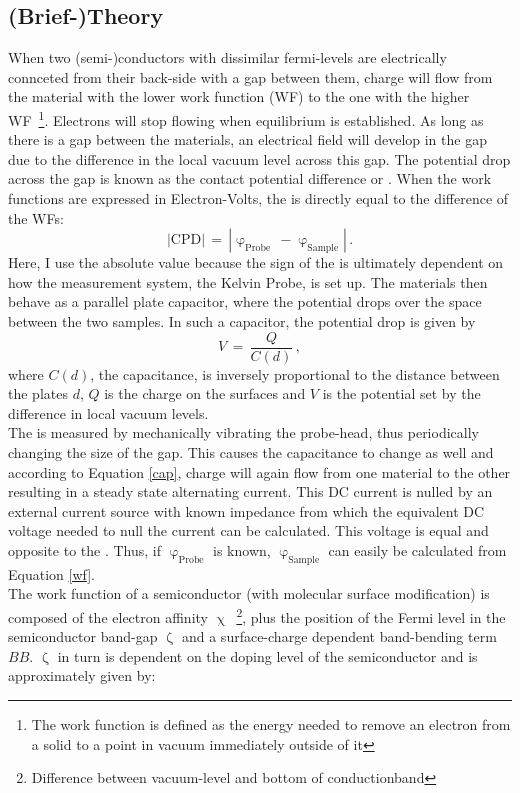 \documentclass[a4paper,10pt]{article}
\newcommand{\wfp}{\ensuremath{\upvarphi _{\text{Probe}}}}
\newcommand{\wfs}{\ensuremath{\upvarphi _{\text{Sample}}}}
\newcommand{\cpd}{\text{CPD}}
\newcommand{\wf}{WF}
\begin{document}
\subsection{(Brief-)Theory}
When two (semi-)conductors with dissimilar fermi-levels are electrically connceted from their back-side with a gap between them, charge will flow from the material with the lower work function (\wf{}) to the one with the higher \wf{}~\footnote{The work function is defined as the energy needed to remove an electron from a solid to a point in vacuum immediately outside of it}. Electrons will stop flowing when equilibrium is established. As long as there is a gap between the materials, an electrical field will develop in the gap due to the difference in the local vacuum level across this gap. 
The potential drop across the gap is known as the contact potential difference or \cpd{}. When the work functions are expressed in Electron-Volts, the \cpd{} is directly equal to the difference of the \wf{}s:
\begin{equation}
\label{wf}
	|{\cpd}| \, = \, | \wfp \, - \wfs | \, .
\end{equation}
Here, I use the absolute value because the sign of the \cpd{} is ultimately dependent on how the measurement system, the Kelvin Probe, is set up. The materials then behave as a parallel plate capacitor, where the potential drops over the space between the two samples. In such a capacitor, the potential drop is given by
\begin{equation}
\label{cap}
	V \, = \,  \frac{Q}{C(d)} \, , 
\end{equation}
where $C(d)$, the capacitance, is inversely proportional to the distance between the plates $d$, $Q$ is the charge on the surfaces and $V$ is the potential set by the difference in local vacuum levels.\\
The \cpd{} is measured by mechanically vibrating the probe-head, thus periodically changing the size of the gap. This causes the capacitance to change as well and according to Equation \eqref{cap}, charge will again flow from one material to the other resulting in a steady state alternating current. This DC current is nulled by an external current source with known impedance from which the equivalent DC voltage needed to null the current can be calculated. This voltage is equal and opposite to the \cpd{}. Thus, if \wfp{} is known, \wfs{} can easily be calculated from Equation \eqref{wf}.\\
The work function of a semiconductor (with molecular surface modification) is composed of the electron affinity $\upchi$~\footnote{Difference between vacuum-level and bottom of conductionband}, plus the position of the Fermi level in the semiconductor band-gap $\upzeta$ and a surface-charge dependent band-bending term $BB$. $\upzeta$ in turn is dependent on the doping level of the semiconductor and is approximately given by:\\
\end{document}
